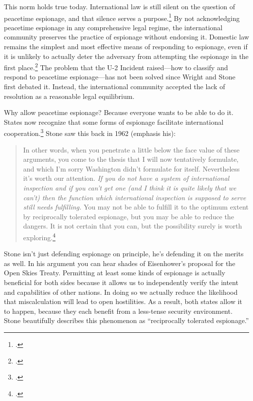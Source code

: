 \documentclass{report}
\begin{document}
\begin{refsegment}
This norm holds true today. International law is still silent on the question of peacetime espionage, and that silence serves a purpose.\footcite[p.~653]{beim_enforcing_2018} By not acknowledging peacetime espionage in any comprehensive legal regime, the international community preserves the practice of espionage without endorsing it. Domestic law remains the simplest and most effective means of responding to espionage, even if it is unlikely to actually deter the adversary from attempting the espionage in the first place.\footcite[p.~657]{beim_enforcing_2018} The problem that the U-2 Incident raised---how to classify and respond to peacetime espionage---has not been solved since Wright and Stone first debated it. Instead, the international community accepted the lack of resolution as a reasonable legal equilibrium.

Why allow peacetime espionage? Because everyone wants to be able to do it. States now recognize that some forms of espionage facilitate international cooperation.\footcite{baker_tolerance_2004} Stone saw this back in 1962 (emphasis his):


\begin{quote}
In other words, when you penetrate a little below the face value of these arguments, you come to the thesis that I will now tentatively formulate, and which I'm sorry Washington didn't formulate for itself. Nevertheless it's worth our attention. \emph{If you do not have a system of international inspection and if you can't get one (and I think it is quite likely that we can't) then the function which international inspection is supposed to serve still needs fulfilling.} You may not be able to fulfill it to the optimum extent by reciprocally tolerated espionage, but you may be able to reduce the dangers. It is not certain that you can, but the possibility surely is worth exploring.\footcite[p.~41]{stone_legal_1962}
\end{quote}

Stone isn't just defending espionage on principle, he's defending it on the merits as well. In his argument you can hear shades of Eisenhower's proposal for the Open Skies Treaty. Permitting at least some kinds of espionage is actually beneficial for both sides because it allows us to independently verify the intent and capabilities of other nations. In doing so we actually reduce the likelihood that miscalculation will lead to open hostilities. As a result, both states allow it to happen, because they each benefit from a less-tense security environment. Stone beautifully describes this phenomenon as ``reciprocally tolerated espionage.''


\end{refsegment}
\end{document}
